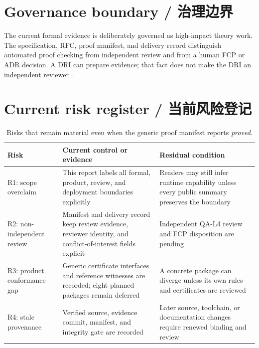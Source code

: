 \label{ch:safety}

\section{Governance boundary / 治理边界}

The current formal evidence is deliberately governed as high-impact theory work. The specification,
RFC, proof manifest, and delivery record distinguish automated proof checking from independent
review and from a human FCP or ADR decision. A DRI can prepare evidence; that fact does not make
the DRI an independent reviewer \citep{cantiluneSpec,cantiluneRFCTwo,cantiluneClosure}.



\section{Current risk register / 当前风险登记}

\begin{table}[H]
\centering
\caption{Risks that remain material even when the generic proof manifest reports \emph{proved}.}
\label{tab:controls}
\begin{tabularx}{\textwidth}{@{}L{0.23\textwidth}Y L{0.22\textwidth}@{}}
\toprule
{}
\textbf{Risk} & \textbf{Current control or evidence} & \textbf{Residual condition} \\
\midrule
R1: scope overclaim & This report labels all formal, product, review, and deployment boundaries explicitly & Readers may still infer runtime capability unless every public summary preserves the boundary \\
R2: non-independent review & Manifest and delivery record keep review evidence, reviewer identity, and conflict-of-interest fields explicit & Independent QA-L4 review and FCP disposition are pending \\
R3: product conformance gap & Generic certificate interfaces and reference witnesses are recorded; eight planned packages remain deferred & A concrete package can diverge unless its own rules and certificates are reviewed \\
R4: stale provenance & Verified source, evidence commit, manifest, and integrity gate are recorded & Later source, toolchain, or documentation changes require renewed binding and review \\
\bottomrule
\end{tabularx}
\end{table}

